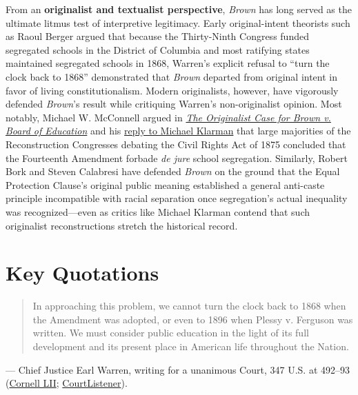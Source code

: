 \documentclass[12pt]{article}
\begin{document}
From an \textbf{originalist and textualist perspective}, \textit{Brown} has long served as the ultimate litmus test of interpretive legitimacy. Early original-intent theorists such as Raoul Berger argued that because the Thirty-Ninth Congress funded segregated schools in the District of Columbia and most ratifying states maintained segregated schools in 1868, Warren's explicit refusal to ``turn the clock back to 1868'' demonstrated that \textit{Brown} departed from original intent in favor of living constitutionalism. Modern originalists, however, have vigorously defended \textit{Brown}'s result while critiquing Warren's non-originalist opinion. Most notably, Michael W. McConnell argued in \href{https://chicagounbound.uchicago.edu/cgi/viewcontent.cgi?article=12612&context=journal_articles}{\textit{The Originalist Case for Brown v. Board of Education}} and his \href{https://chicagounbound.uchicago.edu/cgi/viewcontent.cgi?article=12613&context=journal_articles}{reply to Michael Klarman} that large majorities of the Reconstruction Congresses debating the Civil Rights Act of 1875 concluded that the Fourteenth Amendment forbade \textit{de jure} school segregation. Similarly, Robert Bork and Steven Calabresi have defended \textit{Brown} on the ground that the Equal Protection Clause's original public meaning established a general anti-caste principle incompatible with racial separation once segregation's actual inequality was recognized---even as critics like Michael Klarman contend that such originalist reconstructions stretch the historical record.

\section{Key Quotations}

\begin{quote}
In approaching this problem, we cannot turn the clock back to 1868 when the Amendment was adopted, or even to 1896 when Plessy v. Ferguson was written. We must consider public education in the light of its full development and its present place in American life throughout the Nation.
\end{quote}
\noindent --- Chief Justice Earl Warren, writing for a unanimous Court, 347 U.S. at 492--93 (\href{https://www.law.cornell.edu/supremecourt/text/347/483/USSC_PRO_347_483_1}{Cornell LII}; \href{https://www.courtlistener.com/opinion/105221/brown-v-board-of-education/}{CourtListener}).
\end{document}
